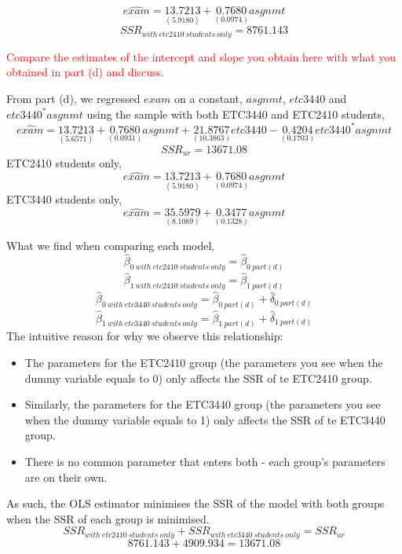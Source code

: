 \documentclass[12pt]{report}
\begin{document}
\vspace{-\baselineskip}
$$\widehat{exam} = \underset{(5.9180)}{13.7213} + \underset{(0.0974)}{0.7680}asgnmt$$
$$SSR_{with\ etc2410\ students\ only} = 8761.143$$

\noindent \textcolor{red}
{
	Compare the estimates of the intercept and slope you obtain here with what you obtained in part (d) and discuss.
}

\noindent From part (d), we regressed $exam$ on a constant, $asgnmt$, $etc3440$ and $etc3440^*asgnmt$ using the sample with both ETC3440 and ETC2410 students,
$$\widehat{exam} = \underset{(5.6571)}{13.7213} + \underset{(0.0931)}{0.7680}asgnmt + \underset{(10.3863)}{21.8767}etc3440 - \underset{(0.1703)}{0.4204}etc3440^*asgnmt$$
$$SSR_{ur} = 13671.08$$
\noindent ETC2410 students only,
$$\widehat{exam} = \underset{(5.9180)}{13.7213} + \underset{(0.0974)}{0.7680}asgnmt$$
\noindent ETC3440 students only,
$$\widehat{exam} = \underset{(8.1089)}{35.5979} + \underset{(0.1328)}{0.3477}asgnmt$$

\noindent What we find when comparing each model,
$$\hat{\beta}_{0\ with\ etc2410\ students\ only} = \hat{\beta}_{0\ part(d)}$$
$$\hat{\beta}_{1\ with\ etc2410\ students\ only} = \hat{\beta}_{1\ part(d)}$$
$$\hat{\beta}_{0\ with\ etc3440\ students\ only} = \hat{\beta}_{0\ part(d)} + \hat{\delta}_{0\ part(d)}$$
$$\hat{\beta}_{1\ with\ etc3440\ students\ only} = \hat{\beta}_{1\ part(d)} + \hat{\delta}_{1\ part(d)}$$
\noindent The intuitive reason for why we observe this relationship: 
\begin{itemize}
	\item The parameters for the ETC2410 group (the parameters you see when the dummy variable equals to 0) only affects the SSR of te ETC2410 group.
	\item Similarly, the parameters for the ETC3440 group (the parameters you see when the dummy variable equals to 1) only affects the SSR of te ETC3440 group.
	\item There is no common parameter that enters both - each group's parameters are on their own.
\end{itemize}
\noindent As such, the OLS estimator minimises the SSR of the model with both groups when the SSR of each group is minimised.
$$SSR_{with\ etc2410\ students\ only} + SSR_{with\ etc3440\ students\ only} = SSR_{ur}$$
$$8761.143 + 4909.934 = 13671.08$$
\end{document}
